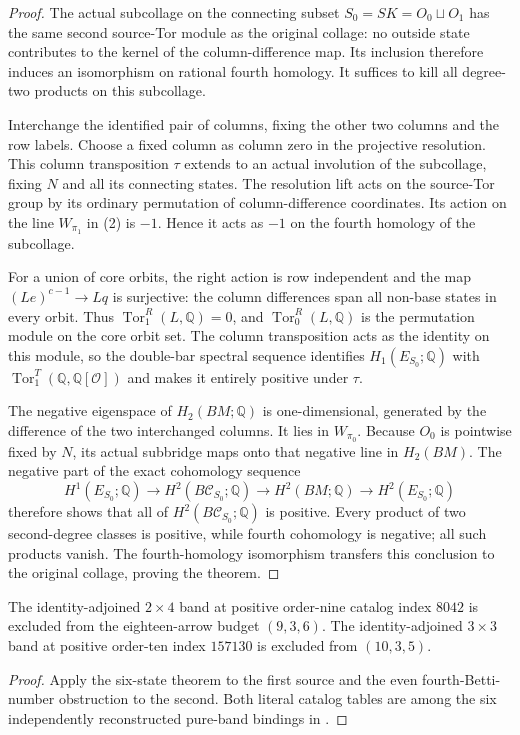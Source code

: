 \begin{proof}
The actual subcollage on the connecting subset
$S_0=SK=O_0\sqcup O_1$ has the same second source-Tor
module as the original collage: no outside state
contributes to the kernel of the column-difference
map.  Its inclusion therefore induces an isomorphism
on rational fourth homology.  It suffices to kill
all degree-two products on this subcollage.

Interchange the identified pair of columns, fixing
the other two columns and the row labels.
Choose a fixed column as column zero in the projective
resolution.  This column transposition $\tau$ extends
to an actual involution of the subcollage, fixing $N$
and all its connecting states.
The resolution lift acts on the source-Tor group
by its ordinary permutation of column-difference
coordinates.  Its action on the line $W_{\pi_1}$
in (2) is $-1$.  Hence it acts as $-1$ on the
fourth homology of the subcollage.

For a union of core orbits, the right action is row
independent and the map
$(Le)^{c-1}\to Lq$ is surjective: the column differences
span all non-base states in every orbit.
Thus $\operatorname{Tor}^{R}_1(L,\mathbb Q)=0$,
and $\operatorname{Tor}^{R}_0(L,\mathbb Q)$ is the
permutation module on the core orbit set.
The column transposition acts as the identity on this
module, so the double-bar spectral sequence identifies
$H_1(E_{S_0};\mathbb Q)$ with
$\operatorname{Tor}^{T}_1(\mathbb Q,\mathbb Q[\mathcal O])$
and makes it entirely positive under $\tau$.

The negative eigenspace of $H_2(BM;\mathbb Q)$ is
one-dimensional, generated by the difference of the
two interchanged columns.  It lies in $W_{\pi_0}$.
Because $O_0$ is pointwise fixed by $N$, its actual
subbridge maps onto that negative line in $H_2(BM)$.
The negative part of the exact cohomology sequence
\[
 H^1(E_{S_0};\mathbb Q)\longrightarrow
 H^2(B\mathcal C_{S_0};\mathbb Q)\longrightarrow
 H^2(BM;\mathbb Q)\longrightarrow H^2(E_{S_0};\mathbb Q)
\]
therefore shows that all of $H^2(B\mathcal C_{S_0};\mathbb Q)$
is positive.  Every product of two second-degree
classes is positive, while fourth cohomology is negative;
all such products vanish.  The fourth-homology
isomorphism transfers this conclusion to the original
collage, proving the theorem.
\end{proof}

\begin{corollary}
\label{CP2:A-pure-band-nine-ten-right-zero}
The identity-adjoined $2\times4$ band at positive
order-nine catalog index $8042$ is excluded from
the eighteen-arrow budget $(9,3,6)$.
The identity-adjoined $3\times3$ band at positive
order-ten index $157130$ is excluded from $(10,3,5)$.
\end{corollary}
\begin{proof}
Apply the six-state theorem to the first source and
the even fourth-Betti-number obstruction to the second.
Both literal catalog tables are among the six
independently reconstructed pure-band bindings in
.
\end{proof}

